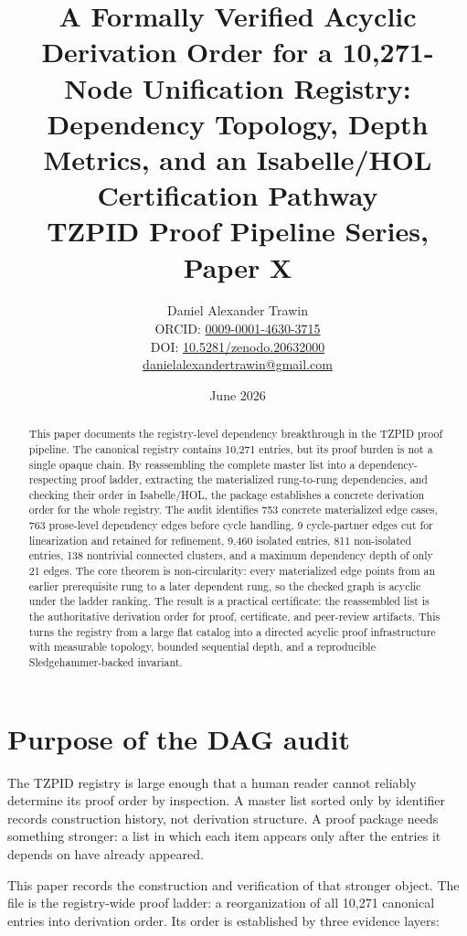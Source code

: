 \documentclass[11pt]{article}
\title{A Formally Verified Acyclic Derivation Order for a 10,271-Node Unification Registry:\\
Dependency Topology, Depth Metrics, and an Isabelle/HOL Certification Pathway\\[0.6em]
\large TZPID Proof Pipeline Series, Paper X}
\author{Daniel Alexander Trawin\\
\small ORCID: \href{https://orcid.org/0009-0001-4630-3715}{0009-0001-4630-3715}\\
\small DOI: \href{https://doi.org/10.5281/zenodo.20632000}{10.5281/zenodo.20632000}\\
\small \href{mailto:danielalexandertrawin@gmail.com}{danielalexandertrawin@gmail.com}}
\date{June 2026}
\theoremstyle{remark}
\begin{document}
\maketitle

\begin{abstract}
This paper documents the registry-level dependency breakthrough in the TZPID proof pipeline. The canonical registry contains 10,271 entries, but its proof burden is not a single opaque chain. By reassembling the complete master list into a dependency-respecting proof ladder, extracting the materialized rung-to-rung dependencies, and checking their order in Isabelle/HOL, the package establishes a concrete derivation order for the whole registry. The audit identifies 753 concrete materialized edge cases, 763 prose-level dependency edges before cycle handling, 9 cycle-partner edges cut for linearization and retained for refinement, 9,460 isolated entries, 811 non-isolated entries, 138 nontrivial connected clusters, and a maximum dependency depth of only 21 edges. The core theorem is non-circularity: every materialized edge points from an earlier prerequisite rung to a later dependent rung, so the checked graph is acyclic under the ladder ranking. The result is a practical certificate: the reassembled list is the authoritative derivation order for proof, certificate, and peer-review artifacts. This turns the registry from a large flat catalog into a directed acyclic proof infrastructure with measurable topology, bounded sequential depth, and a reproducible Sledgehammer-backed invariant.
\end{abstract}

\section{Purpose of the DAG audit}
\label{sec:purpose}

The TZPID registry is large enough that a human reader cannot reliably determine its proof order by inspection. A master list sorted only by identifier records construction history, not derivation structure. A proof package needs something stronger: a list in which each item appears only after the entries it depends on have already appeared.

This paper records the construction and verification of that stronger object. The file  is the registry-wide proof ladder: a reorganization of all 10,271 canonical entries into derivation order. Its order is established by three evidence layers:
\end{document}
